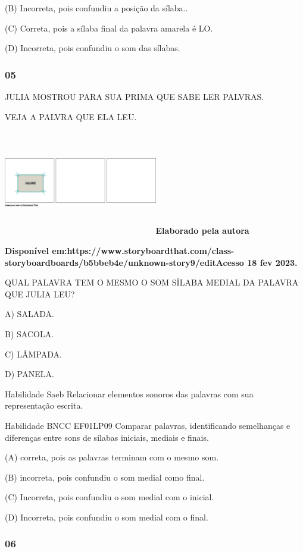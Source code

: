 \begin{escola}
(B) Incorreta, pois confundiu a posição da sílaba..

(C) Correta, pois a sílaba final da palavra amarela é LO.

(D) Incorreta, pois confundiu o som das sílabas.

\subsubsection{05}\label{section-30}

JULIA MOSTROU PARA SUA PRIMA QUE SABE LER PALVRAS.

VEJA A PALVRA QUE ELA LEU.

\includegraphics[width=2.64104in,height=1.80504in]{media/image190.png}\textbf{Elaborado
pela autora}

\textbf{Disponível
em:https://www.storyboardthat.com/class-storyboardboards/b5bbeb4e/unknown-story9/editAcesso
18 fev 2023.}

QUAL PALAVRA TEM O MESMO O SOM SÍLABA MEDIAL DA PALAVRA QUE JULIA LEU?

A) SALADA.

B) SACOLA.

C) LÂMPADA.

D) PANELA.

Habilidade Saeb Relacionar elementos sonoros das palavras com sua
representação escrita.

Habilidade BNCC EF01LP09 Comparar palavras, identificando semelhanças e
diferenças entre sons de sílabas iniciais, mediais e finais.

(A) correta, pois as palavras terminam com o mesmo som.

(B) incorreta, pois confundiu o som medial como final.

(C) Incorreta, pois confundiu o som medial com o inicial.

(D) Incorreta, pois confundiu o som medial com o final.

\subsubsection{06}\label{section-31}


\end{escola}
